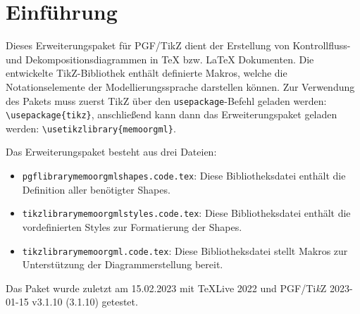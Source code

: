 \begin{figure}[htbp]
\end{figure}

\section{Einführung}
\label{sec:Einfuehrung}

Dieses Erweiterungspaket für PGF/TikZ dient der Erstellung von \memoorgml Kontrollfluss- und
Dekompositionsdiagrammen \citep{Frank:MEMOOrgML2} in \TeX{} bzw. \LaTeX{} Dokumenten.
Die entwickelte TikZ-Bibliothek enthält definierte Makros, welche die Notationselemente der Modellierungssprache \memoorgml darstellen können.
Zur Verwendung des Pakets muss zuerst TikZ über den \texttt{usepackage}-Befehl geladen werden: \lstinline|\usepackage{tikz}|, anschließend kann dann das Erweiterungspaket geladen werden: \lstinline|\usetikzlibrary{memoorgml}|.\medskip

\noindent Das Erweiterungspaket besteht aus drei Dateien:
\begin{itemize}
    \item {\texttt{pgflibrarymemoorgmlshapes.code.tex}: Diese Bibliotheksdatei enthält die Definition aller benötigter Shapes.}
    \item {\texttt{tikzlibrarymemoorgmlstyles.code.tex}: Diese Bibliotheksdatei enthält die vordefinierten Styles zur Formatierung der Shapes.}
    \item {\texttt{tikzlibrarymemoorgml.code.tex}: Diese Bibliotheksdatei stellt Makros zur Unterstützung der Diagrammerstellung bereit.}
\end{itemize}
\noindent Das Paket wurde zuletzt am 15.02.2023 mit \TeX{}Live 2022 und PGF/Ti\textit{k}Z 2023-01-15 v3.1.10 (3.1.10) getestet.\medskip
\newpage

